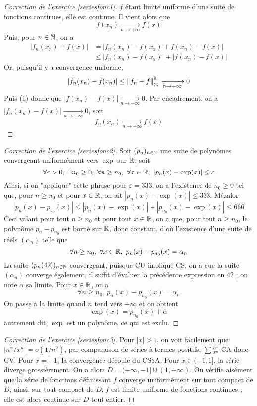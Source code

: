 \begin{proof}[Correction de l'exercice \ref{seriesfonc1}]
	$f$ étant limite uniforme d'une suite de fonctions continues, elle est continue. 
    Il vient alors que \[f(x_n)\xrightarrow[n\to+\infty]{} f(x)\tag{1}\]
	Puis, pour $n\in\operatorname{\mathbb N}$, on a 
    \begin{align*}
        |f_n(x_n)-f(x)|&=|f_n(x_n)-f(x_n)+f(x_n)-f(x)|\\ 
                    &\leq|f_n(x_n)-f(x_n)|+|f(x_n)-f(x)|
    \end{align*}
	Or, puisqu'il y a convergence uniforme,
    \[
        |f_n(x_n)-f(x_n)|\leq \left\lVert f_n-f\right\rVert_\infty^{\operatorname{\mathbb R}}\xrightarrow[n\to+\infty]{} 0
    \] 
    Puis (1) donne que $|f(x_n)-f(x)|\xrightarrow[n\to+\infty]{}0$.
    Par encadrement, on a $|f_n(x_n)-f(x)|\xrightarrow[n\to+\infty]{} 0$, soit \[\boxed{f_n(x_n)\xrightarrow[n\to+\infty]{}f(x)}\]
\end{proof}

\begin{proof}[Correction de l'exercice \ref{seriesfonc2}]
	Soit $(p_n)_{n\in\operatorname{\mathbb N}}$ une suite de polynômes convergeant uniformément vers $\exp$ sur $\operatorname{\mathbb R}$, soit 
    \[\forall \varepsilon > 0,\ \exists n_0\geq 0,\ \forall n\geq n_0,\ \forall x\in\R,\ |p_n(x)-\exp(x)|\leq \varepsilon\]
	Ainsi, si on "applique" cette phrase pour $\varepsilon = 333$, on a l'existence de $n_0\geq 0$ tel que, pour $n\geq n_0$ et pour $x\in\operatorname{\mathbb R}$, on ait $|p_n(x)-\exp(x)|\leq 333$. 
    Mézalor \[|p_n(x)-p_{n_0}(x)|\leq |p_n(x)-\exp(x)|+|p_{n_0}(x)-\exp(x)|\leq 666\]
	Ceci valant pour tout $n\geq n_0$ et pour tout $x\in\operatorname{\mathbb R}$, on a que, pour tout $n\geq n_0$, le polynôme $p_n-p_{n_0}$ est borné sur $\operatorname{\mathbb R}$, donc constant, 
    d'où l'existence d'une suite de réels $(\alpha_n)$ telle que \[\forall n\geq n_0,\ \forall x\in\operatorname{\mathbb R},\ p_n(x)-p_{n_0}(x)=\alpha_n\]
	La suite $(p_n(42))_{n\in\operatorname{\mathbb N}}$ convergeant, puisque CU implique CS, on a que la suite $(\alpha_n)$ converge également, 
    il suffit d'évaluer la précédente expression en $42$ ; on note $\alpha$ sa limite. Pour $x\in\operatorname{\mathbb R}$, on a \[\forall n\geq n_0,\ p_n(x)-p_{n_0}(x)=\alpha_n\]
	On passe à la limite quand $n$ tend vers $+\infty$ et on obtient \[\exp(x)=p_{n_0}(x)+\alpha\]
	autrement dit, $\exp$ est un polynôme, ce qui est exclu.
\end{proof}

\begin{proof}[Correction de l'exercice \ref{seriesfonc3}]
	Pour $|x|>1$, on voit facilement que $|n^x/x^n|=o(1/n^2)$, par comparaison de séries à termes positifs, $\sum\frac{n^x}{x^n}$ CA donc CV. 
    Pour $x=-1$, la convergence découle du CSSA.
    Pour $x\in(-1,1]$, la série diverge grossièrement. 
    On a alors $D=(-\infty,-1]\cup(1,+\infty)$.
    On vérifie aisément que la série de fonctions définissant $f$ converge uniformément sur tout compact de $D$, 
    ainsi, sur tout compact de $D$, $f$ est limite uniforme de fonctions continues ; elle est alors continue sur $D$ tout entier.
\end{proof}
